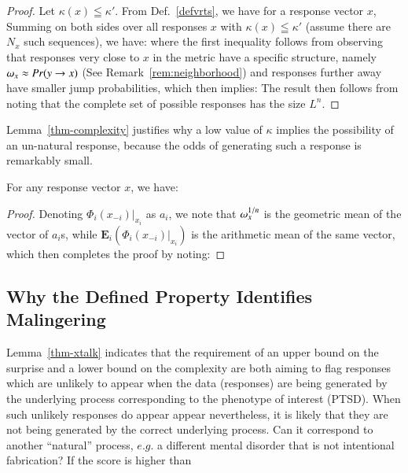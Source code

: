 \documentclass[onecolumn,10pt]{IEEEtran}
\begin{document}
\begin{proof} Let $\kappa(x) \leqq \kappa'$. From Def.~\ref{defvrts},   we have for a response vector $x$, 
  Summing on both sides over all responses $x $ with $\kappa(x)\leqq \kappa'$ (assume there are $N_x$ such sequences), we have:
  where the first inequality follows from observing that responses very close to $x$ in the \qdist metric have a specific structure, namely $\omega_{x} \approx Pr(y \rightarrow x)$ (See Remark~\ref{rem:neighborhood}) and responses further away have smaller jump probabilities, which then  implies:
  The result then follows from noting that the complete set of possible responses has the size $L^n$.
\end{proof}
% 
Lemma~\ref{thm-complexity} justifies why a low value of $\kappa$ implies the possibility of an un-natural response, because the odds of generating such a response is remarkably small.
% 
\begin{lem}[Surprise]\label{thm-xtalk}
  For any response vector $x$, we have:
\end{lem}
% 
\begin{proof}
  Denoting $\Phi_i (x_{-i}) \vert_{x_i}$ as $a_i$, we note that $\omega_{x}^{1/n} $ is the geometric mean of the vector of $a_i$s, while $\mathbf{E}_i \left (   \Phi_i (x_{-i}) \vert_{x_i}   \right )$ is the arithmetic mean of the same vector, which then completes the proof by noting:
\end{proof}
% 
\subsection*{Why the Defined Property Identifies Malingering}

Lemma~\ref{thm-xtalk} indicates that the requirement of  an upper bound on the surprise  and a lower bound on the complexity  are  both aiming to flag responses which are   unlikely to appear when the data (responses) are being generated by the  underlying process  corresponding to the phenotype of interest (PTSD).   When such unlikely responses do appear appear nevertheless, it is likely that they  are not being generated by the correct underlying process.  Can it correspond to another ``natural'' process, $e.g.$ a different mental disorder that is not intentional fabrication? If the score is higher than 
\end{document}

